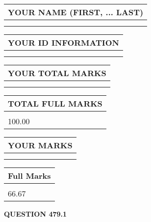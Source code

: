 \documentclass{ctexart}
\begin{document}
   
   
   
\newpage 
\setcounter{page}{ 
   479001 } 
   
   
   
   
\noindent\begin{tabular}{|l|}
\hline
YOUR NAME (FIRST, ... LAST)  \\
\hline
 \\ 
 \\ 
\hline
\end{tabular}
\hspace{0.05in} \begin{tabular}{|l|}
\hline
 YOUR   ID   INFORMATION  \\
\hline
 \\ 
 \\ 
\hline
\end{tabular}
   
   
\vspace{0.2in}\noindent\begin{tabular}{|l|}
\hline
YOUR TOTAL MARKS  \\
\hline
 \\ 
 \\ 
\hline
\end{tabular}
\hspace{0.05in} \begin{tabular}{|l|}
\hline
TOTAL FULL MARKS  \\
\hline
 \\ 
100.00 \\
\hline
\end{tabular}
   
   
 \vspace{0.2in}
 
 
 
 
   
   
  
\vspace{0.2in}
  
\noindent\begin{tabular}{|l|}
\hline
 YOUR MARKS  \\
\hline
 \\ 
 \\ 
\hline
\end{tabular}
\hspace{0.05in} \begin{tabular}{|l|}
\hline
 Full Marks  \\
\hline
 \\ 
66.67 \\
\hline
\end{tabular}
{\textbf{\Large{QUESTION
479.1 
}}}
  
\end{document}
